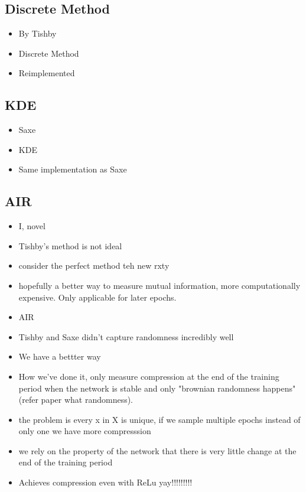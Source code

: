 \documentclass[dissertation.tex]{subfiles}
\begin{document}
\subsection{Discrete Method}

\begin{itemize}
  \item{
      By Tishby
    }
  \item{
      Discrete Method
    }
  \item{
      Reimplemented 
    }
\end{itemize}

\subsection{KDE}

\begin{itemize}
  \item{
      Saxe
    }
  \item{
      KDE
    }
  \item{
      Same implementation as Saxe
    }
\end{itemize}

\subsection{AIR}

\begin{itemize}
  \item{
      I, novel
    }
  \item{
      Tishby's method is not ideal
    }
  \item{
      consider the perfect method teh new rxty
    }
  \item{
      hopefully a better way to measure mutual information, more computationally
      expensive. Only applicable for later epochs.
    }
  \item{
      AIR
    }
\end{itemize}


\begin{itemize}
  \item{
      Tishby and Saxe didn't capture randomness incredibly well 
    }
  \item{
      We have a bettter way
    }
  \item{
      How we've done it, only measure compression at the end of the training
      period when the network is stable and only "brownian randomness
      happens"(refer paper what randomness).
    }
  \item{
      the problem is every x in X is unique, if we sample multiple epochs
      instead of only one we have more compresssion
    }
  \item{
      we rely on the property of the network that there is very little change at
      the end of the training period
    }
  \item{
      Achieves compression even with ReLu yay!!!!!!!!!
    }
\end{itemize}
\end{document}
